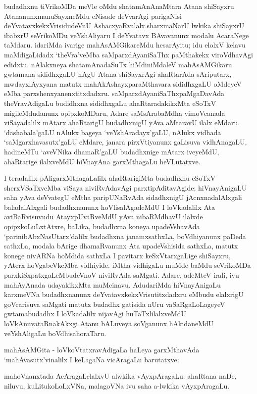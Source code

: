 budadhxnu tiVrikoMDa meVle oMdu shatamAnAnaMtara Atana shiSayxru Atananunx\break manuSayxneMdu eNisade deVvarAgi parigaNisi deYvatavxkekxVrisidudeVnU AshacxyaRvalalx.\break sharxmaNarU lwkika shiSayxrU ibabxrU seVrikoMDu veYshAliyaru I deYvatavx BAva\-vanunx modalu AcaraNege taMdaru. idariMda ivarige mahAsAMGikareMdu hesarAyitu; idu elolxV kelavu maMdigaLidadx `theVra'veMba saMparxdAyaniSaThx paMthakekx viroVdha\-vAgi edidxtu. nAlakxneya shatamAnadaSuTx hiMdiniMdaleV mahAsAMGikaru gwtamana sididhx\-gaLU hAgU Atana shiSayxrAgi ahaRtarAda sAriputarx, mwdayxlAyxyana matutx mahA\-kAshayxparaMthavara sididhxgaLU oMdeyeV eMba parxshenxyanenxtitxdadxru. saMparxdAyaniSaThx\break paMgaDavAda theVravAdigaLu budidhxna sididhxgaLu ahaRtaradakikxMta eSoTxV migileMdu\-danunx opipxkoMDaru, Adare saMsArabaMdha vimoVcanada viSayadalilx mAtarx ahaRtarigU budadhxnigU yAva aMtaravU ilalx eMdaru. `dashabala'gaLU nAlukx bageya `veYshAradayx'gaLU, nAlukx vidhada `saMgarxhavasutx'gaLU eMdare, janara pirxVtiyanunx gaLisuva vidhAnagaLU, hadineMTu `aveVNika dhamaR'gaLU budadhxnige mAtarx iveyeMdU, ahaRtarige ilalxveMdU hiVnayAna garxMthagaLu heVLutatxve.

I teradalilx pAligarxMthagaLalilx ahaRtarigiMta budadhxnu eSoTxV sherxVSaTxveMba viSaya niviRvAdavAgi parxtipAditavAgide; hiVnayAnigaLU saha yAva deVvategU eMtha paripUNaRvAda sidadhxnigU  jAcnxnadalAlxgali baladalAlxgali budadhxnanunx hoVlisalAga\break\-deMdU I loVkadalilx Ata aviBaRvisuvudu AtayxpUvaRveMdU yAva nibaRM\-dhavU ilalxde opipxkoLuLxtAtxre, baLika, budadhxna koneya upadeVshavAda `parinibAbxNa\-sUtarx'dalilx budadhxna janamxsathxLa, boVdhiyanunx paDeda sathxLa, modala bArige dhamaR\-vanunx Ata upadeVshisida sathxLa, matutx konege nivARNa hoMdida sathxLa I pavitarx keSxVtarx\-gaLige shiSayxru, yAterx hoVgabeVkeMba vidhiyide. iMtha vidhigaLu muMde baMdu seVrikoMDa parxkiSxpatxgaLeMbudeVnoV niviRvAda saMgati. Adare, adeMteV irali, ivu mahAyAnada udayakikxMta muMcinavu. AdudariMda hiVnayAnigaLu karxmeVNa budadhxnanunx deYvatavxkekxVrisutitxdadxru eMbudu elalxrigU goVcarisuva saMgati matutx budadhx gatisida nUru vaSaRgaLoLageyeV gwtamabudadhx I loVkadalilx nijavAgi huTaTxlilalxveMdU loVkAnuvataRnakAkxgi Atanu bALuveya soVganunx hAkidaneMdU veYshAligaLu boVdhisahoraTaru.

mahAsAMGita - loVkoVtatxravAdigaLa haLeya garxMthavAda `mahAvasutx'vinalilx I keLagaNa vicAragaLu barutatxve:

mahoVnanxtada AcAragaLelalxvU alwkika vAyxpAragaLu. ahaRtana naDe, niluvu, kuLitukoLoLxVNa, malagoVNa ivu saha a-lwkika vAyxpAragaLu.

